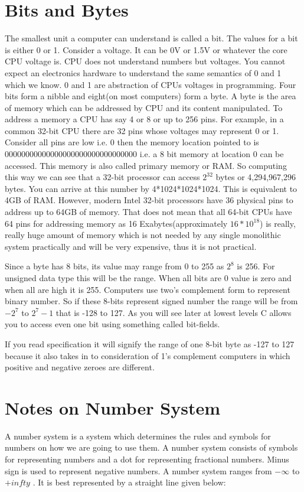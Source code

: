 \section{Bits and Bytes}
The smallest unit a computer can understand is called a bit. The values for a
bit is either 0 or 1. Consider a voltage. It can be 0V or 1.5V or whatever the
core CPU voltage is. CPU does not understand numbers but voltages. You
cannot expect an electronics hardware to understand the same semantics of 0 and
1 which we know. 0 and 1 are abstraction of CPUs voltages in programming. Four
bits form a nibble and eight(on most computers) form a byte. A byte is the area
of memory which can be addressed by CPU and its content manipulated. To address
a memory a CPU has say 4 or 8 or up to 256 pins. For example, in a common
32-bit CPU there are 32 pins whose voltages may represent 0 or 1. Consider all
pins are low i.e. 0 then the memory location pointed to is
00000000000000000000000000000000 i.e. a 8 bit memory at location 0 can be
accessed. This memory is also called primary memory or RAM. So computing this
way we can see that a 32-bit processor can access 
$2^{32}$ bytes or 4,294,967,296 bytes. You can arrive at 
this number by 4*1024*1024*1024. This is equivalent to 4GB of RAM. However,
modern Intel 32-bit processors have 36 physical pins to address up to 64GB of
memory. That does not mean that all 64-bit CPUs have 64 pins for addressing
memory as 16 Exabytes(approximately $16*10^{18}$) is really, really huge amount
of memory which is not needed by any single monolithic system practically and
will be very expensive, thus it is not practical. 

Since a byte has 8 bits, its value may range from 0 to 255 as $2^8$ is 256. For
unsigned data type this will be the range. When all bits are 0 value is zero
and when all are high it is 255. Computers use two’s complement form to
represent binary number. So if these 8-bits represent signed number the range
will be from $−2^7$ to $2^7−1$ that is -128 to 127. As you will see later at
lowest levels C allows you to access even one bit using something called
bit-fields.

If you read specification it will signify the range of one 8-bit byte as -127
to 127 because it also takes in to consideration of 1's complement computers in
which positive and negative zeroes are different.

\section{Notes on Number System}
A number system is a system which determines the rules and symbols for numbers
on how we are going to use them.  A number system consists of symbols for
representing numbers and a dot for representing fractional numbers. Minus sign
is used to represent negative numbers. A number system ranges from $-\infty$
to $+infty$ . It is best represented by a straight line given below:

